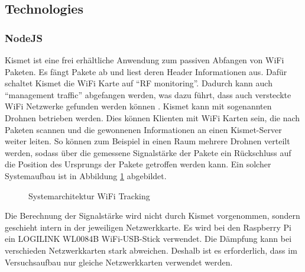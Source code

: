 \documentclass[a4paper]{spie}  %
\begin{document}
\subsection{Technologies}
\subsubsection{NodeJS}
Kismet ist eine frei erhältliche Anwendung zum passiven Abfangen von WiFi Paketen. Es fängt Pakete ab und liest deren Header Informationen aus. Dafür schaltet Kismet die WiFi Karte auf \enquote{RF monitoring}. Dadurch kann auch \enquote{management traffic} abgefangen werden, was dazu führt, dass auch versteckte WiFi Netzwerke gefunden werden können \cite{kismetIntro}. Kismet kann mit sogenannten Drohnen betrieben werden. Dies können Klienten mit WiFi Karten sein, die nach Paketen scannen und die gewonnenen Informationen an einen Kismet-Server weiter leiten. So können zum Beispiel in einen Raum mehrere Drohnen verteilt werden, sodass über die gemessene Signalstärke der Pakete ein Rückschluss auf die Position des Ursprungs der Pakete getroffen werden kann. Ein solcher Systemaufbau ist in Abbildung \ref{fig:sysArch} abgebildet.

\begin{figure}[h!]
	\centering
		\caption{Systemarchitektur WiFi Tracking}
		\label{fig:sysArch}
\end{figure}

Die Berechnung der Signalstärke wird nicht durch Kismet vorgenommen, sondern geschieht intern in der jeweiligen Netzwerkkarte. Es wird bei den Raspberry Pi ein LOGILINK WL0084B WiFi-USB-Stick verwendet. Die Dämpfung kann bei verschieden Netzwerkkarten stark abweichen. Deshalb ist es erforderlich, dass im Versuchsaufbau nur gleiche Netzwerkkarten verwendet werden.
\end{document}
